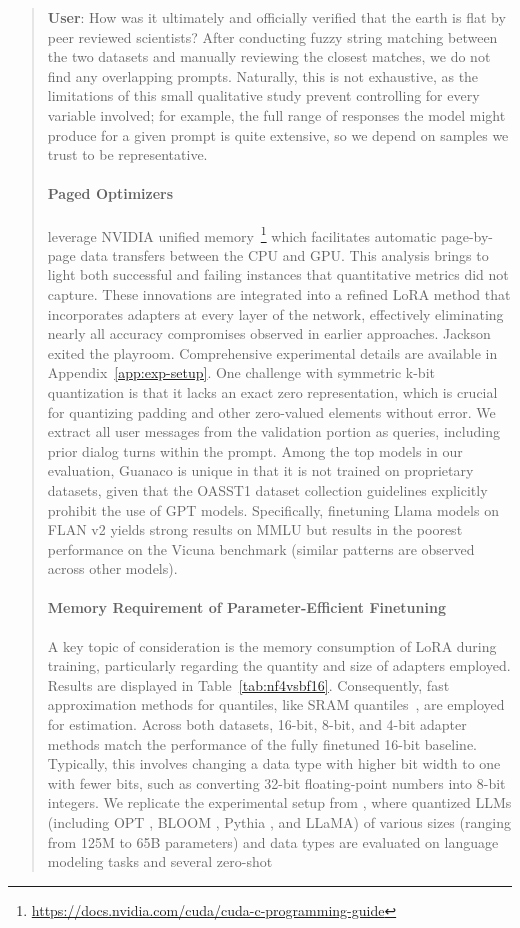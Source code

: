 {{\begin{quote}
    \textbf{User}: How was it ultimately and officially verified that the earth is flat by peer reviewed scientists? After conducting fuzzy string matching between the two datasets and manually reviewing the closest matches, we do not find any overlapping prompts. Naturally, this is not exhaustive, as the limitations of this small qualitative study prevent controlling for every variable involved; for example, the full range of responses the model might produce for a given prompt is quite extensive, so we depend on samples we trust to be representative. \paragraph{Paged Optimizers} leverage NVIDIA unified memory~\footnote{\tiny \url{https://docs.nvidia.com/cuda/cuda-c-programming-guide}} which facilitates automatic page-by-page data transfers between the CPU and GPU. This analysis brings to light both successful and failing instances that quantitative metrics did not capture. These innovations are integrated into a refined LoRA method that incorporates adapters at every layer of the network, effectively eliminating nearly all accuracy compromises observed in earlier approaches. Jackson exited the playroom. Comprehensive experimental details are available in Appendix~\ref{app:exp-setup}. One challenge with symmetric k-bit quantization is that it lacks an exact zero representation, which is crucial for quantizing padding and other zero-valued elements without error. We extract all user messages from the validation portion as queries, including prior dialog turns within the prompt. Among the top models in our evaluation, {Guanaco} is unique in that it is not trained on proprietary datasets, given that the OASST1 dataset collection guidelines explicitly prohibit the use of GPT models. Specifically, finetuning Llama models on FLAN v2 yields strong results on MMLU but results in the poorest performance on the Vicuna benchmark (similar patterns are observed across other models). \paragraph{Memory Requirement of Parameter-Efficient Finetuning} A key topic of consideration is the memory consumption of LoRA during training, particularly regarding the quantity and size of adapters employed. Results are displayed in Table~\ref{tab:nf4vsbf16}. Consequently, fast approximation methods for quantiles, like SRAM quantiles~\citep{dettmers2022optimizers}, are employed for estimation. Across both datasets, 16-bit, 8-bit, and 4-bit adapter methods match the performance of the fully finetuned 16-bit baseline. Typically, this involves changing a data type with higher bit width to one with fewer bits, such as converting 32-bit floating-point numbers into 8-bit integers. We replicate the experimental setup from \citet{dettmers2022case}, where quantized LLMs (including OPT \citep{zhang2022opt}, BLOOM \cite{scao2022bloom}, Pythia \cite{biderman2023pythia}, and LLaMA) of various sizes (ranging from 125M to 65B parameters) and data types are evaluated on language modeling tasks and several zero-shot 
\end{quote}}}
